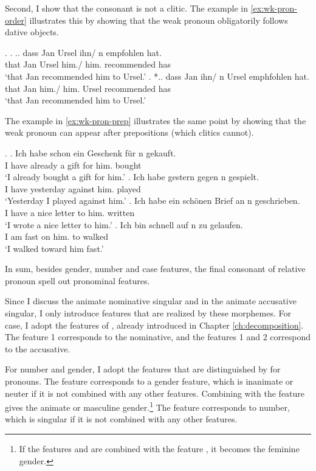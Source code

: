 Second, I show that the consonant is not a clitic.
The example in \ref{ex:wk-pron-order} illustrates this by showing that the weak pronoun obligatorily follows dative objects.

\ex.\label{ex:wk-pron-order}
\ag. .. dass Jan Ursel ihn/ n empfohlen hat.\\
 {} that Jan Ursel him./ him. recommended has\\
 `that Jan recommended him to Ursel.'
\bg. *.. dass Jan ihn/ n Ursel emphfohlen hat.\\
 {} that Jan him./ him. Ursel recommended has\\
 `that Jan recommended him to Ursel.'

The example in \ref{ex:wk-pron-prep} illustrates the same point by showing that the weak pronoun can appear after prepositions (which clitics cannot).

\ex.\label{ex:wk-pron-prep}
\ag. Ich habe schon ein Geschenk für n gekauft.\\
 I have already a gift for him. bought\\
 `I already bought a gift for him.'
\bg. Ich habe gestern gegen n gespielt.\\
I have yesterday against him. played\\
`Yesterday I played against him.'
\bg. Ich habe ein schönen Brief an n geschrieben.\\
I have a nice letter to him. written\\
`I wrote a nice letter to him.'
\bg. Ich bin schnell auf n zu gelaufen.\\
I am fast on him. to walked\\
`I walked toward him fast.'

In sum, besides gender, number and case features, the final consonant of relative pronoun spell out pronominal features.

Since I discuss the animate nominative singular and in the animate accusative singular, I only introduce features that are realized by these morphemes.
For case, I adopt the features of \citet{caha2009}, already introduced in Chapter \ref{ch:decomposition}. The feature 1 corresponds to the nominative, and the features 1 and 2 correspond to the accusative.

For number and gender, I adopt the features that are distinguished by \citet{harley2002} for pronouns. The feature  corresponds to a gender feature, which is inanimate or neuter if it is not combined with any other features. Combining  with the feature  gives the animate or masculine gender.\footnote{
If the features  and  are combined with the feature , it becomes the feminine gender.
}
The feature  corresponds to number, which is singular if it is not combined with any other features.

